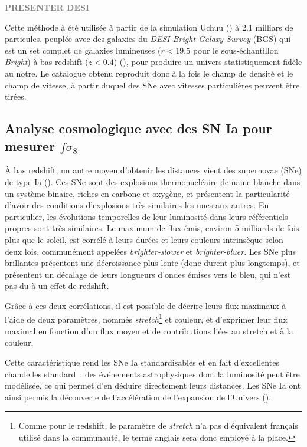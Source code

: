 \documentclass{book}
\newcommand{\todo}[1]{{\textcolor{gray}{\bf \large #1}}}
\begin{document}
\todo{PRESENTER DESI}

Cette méthode à été utilisée à partir de la simulation Uchuu (\cite{prada_desi_2023}) à 2.1 milliars de particules, peuplée avec des galaxies du \textit{DESI Bright Galaxy Survey} (BGS) qui est un set complet de galaxies lumineuses ($r < 19.5$ pour le sous-échantillon \textit{Bright}) à bas redshift ($z<0.4$) (\cite{hahn_desi_2023}), pour produire un univers statistiquement fidèle au notre. Le catalogue obtenu reproduit donc à la fois le champ de densité et le champ de vitesse, à partir duquel des SNe avec vitesses particulières peuvent être tirées.


\subsection{Analyse cosmologique avec des SN Ia pour mesurer $f\sigma_8$}

À bas redshift, un autre moyen d'obtenir les distances vient des supernovae (SNe) de type Ia (\cite{hoyle_nucleosynthesis_1960}). Ces SNe sont des explosions thermonucléaire de naine blanche dans un système binaire, riches en carbone et oxygène, et présentent la particularité d’avoir des conditions d'explosions très similaires les unes aux autres. En particulier, les évolutions temporelles de leur luminosité dans leurs référentiels propres sont très similaires. Le maximum de flux émis, environ 5 milliards de fois plus que le soleil, est corrélé à leurs durées et leurs couleurs intrinsèque selon deux lois, communément appelées \textit{brighter-slower} et \textit{brighter-bluer}. Les SNe plus brillantes présentent une décroissance plus lente (donc durent plus longtemps), et présentent un décalage de leurs longueurs d'ondes émises vers le bleu, qui n'est pas du à un effet de redshift.

Grâce à ces deux corrélations, il est possible de décrire leurs flux maximaux à l'aide de deux paramètres, nommés \textit{stretch}\footnote{Comme pour le redshift, le paramètre de \textit{stretch} n'a pas d'équivalent français utilisé dans la communauté, le terme anglais sera donc employé à la place.} et couleur, et d'exprimer leur flux maximal en fonction d'un flux moyen et de contributions liées au stretch et à la couleur.

Cette caractéristique rend les SNe Ia standardisables et en fait d'excellentes chandelles standard~: des événements astrophysiques dont la luminosité peut être modélisée, ce qui permet d'en déduire directement leurs distances. Les SNe Ia ont ainsi permis la découverte de l'accélération de l'expansion de l'Univers (\cite{perlmutter_cosmology_1998, riess_observational_1998}).
\end{document}
